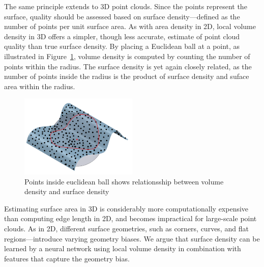 The same principle extends to 3D point clouds. Since the points represent the surface, quality should be assessed based on surface density—defined as the number of points per unit surface area. As with area density in 2D, local volume density in 3D offers a simpler, though less accurate, estimate of point cloud quality than true surface density. By placing a Euclidean ball at a point, as illustrated in Figure~\ref{fig:volume_and_surface}, volume density is computed by counting the number of points within the radius. The surface density is yet again closely related, as the number of points inside the radius is the product of surface density and suface area within the radius.

\begin{figure}[H]
    \centering
    \includegraphics[width=0.5\textwidth]{figures/Surface_volume_density.png}
    \caption{Points inside euclidean ball shows relationsship between volume density and surface density}\label{fig:volume_and_surface}
\end{figure}

Estimating surface area in 3D is considerably more computationally expensive than computing edge length in 2D, and becomes impractical for large-scale point clouds. As in 2D, different surface geometries, such as corners, curves, and flat regions—introduce varying geometry biases. We argue that surface density can be learned by a neural network using local volume density in combination with features that capture the geometry bias.